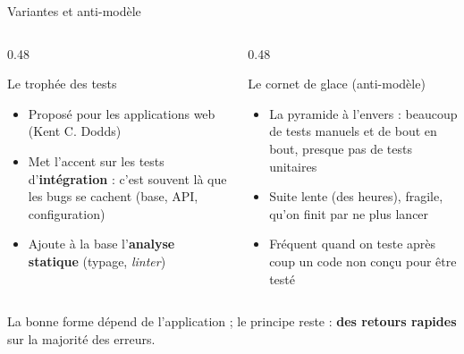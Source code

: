 \documentclass[aspectratio=169,10pt]{beamer}
\begin{document}
\begin{frame}{Variantes et anti-modèle}
  \begin{columns}[T]
    \begin{column}{0.48\textwidth}
      \begin{block}{Le trophée des tests}
        \begin{itemize}
          \item Proposé pour les applications web (Kent C. Dodds)
          \item Met l'accent sur les tests d'\textbf{intégration} : c'est souvent là que les bugs se cachent (base, API, configuration)
          \item Ajoute à la base l'\textbf{analyse statique} (typage, \textit{linter})
        \end{itemize}
      \end{block}
    \end{column}
    \begin{column}{0.48\textwidth}
      \begin{alertblock}{Le cornet de glace (anti-modèle)}
        \begin{itemize}
          \item La pyramide à l'envers : beaucoup de tests manuels et de bout en bout, presque pas de tests unitaires
          \item Suite lente (des heures), fragile, qu'on finit par ne plus lancer
          \item Fréquent quand on teste \og après coup \fg{} un code non conçu pour être testé
        \end{itemize}
      \end{alertblock}
    \end{column}
  \end{columns}
  \vspace{3mm}
  \begin{center}
    La bonne forme dépend de l'application ; le principe reste : \textbf{des retours rapides} sur la majorité des erreurs.
  \end{center}
\end{frame}
\end{document}
